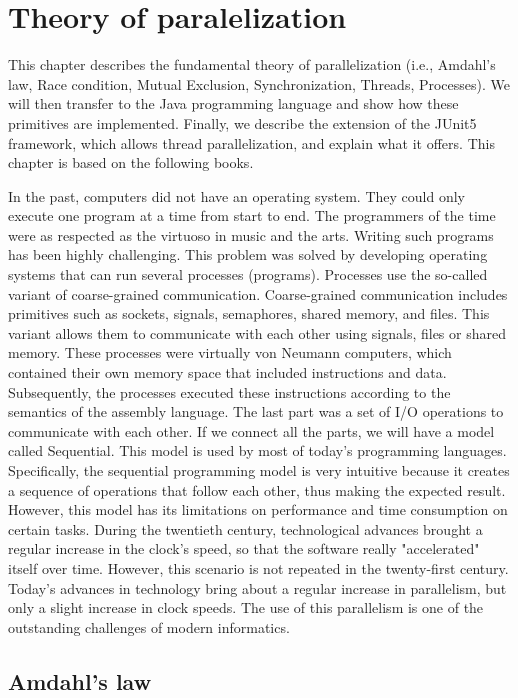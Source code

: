 \chapter{Theory of paralelization}

This chapter describes the fundamental theory of parallelization (i.e., Amdahl's law, Race condition, Mutual Exclusion, Synchronization, Threads, Processes). We will then transfer to the Java programming language and show how these primitives are implemented. Finally, we describe the extension of the JUnit5 framework, which allows thread parallelization, and explain what it offers. This chapter is based on the following books.

In the past, computers did not have an operating system. They could only execute one program at a time from start to end. The programmers of the time were as respected as the virtuoso in music and the arts. Writing such programs has been highly challenging. This problem was solved by developing operating systems that can run several processes (programs). 
Processes use the so-called variant of coarse-grained communication. 
Coarse-grained communication includes primitives such as sockets, signals, semaphores, shared memory, and files. This variant allows them to communicate with each other using signals, files or shared memory.  These processes were virtually von Neumann computers, which contained their own memory space that included instructions and data. Subsequently, the processes executed these instructions according to the semantics of the assembly language. The last part was a set of I/O operations to communicate with each other. If we connect all the parts, we will have a model called Sequential. This model is used by most of today's programming languages.  Specifically, the sequential programming model is very intuitive because it creates a sequence of operations that follow each other, thus making the expected result. However, this model has its limitations on performance and time consumption on certain tasks. During the twentieth century, technological advances brought a regular increase in the clock's speed, so that the software really "accelerated" itself over time. However, this scenario is not repeated in the twenty-first century. Today's advances in technology bring about a regular increase in parallelism, but only a slight increase in clock speeds. The use of this parallelism is one of the outstanding challenges of modern informatics.

\section{Amdahl's law}

